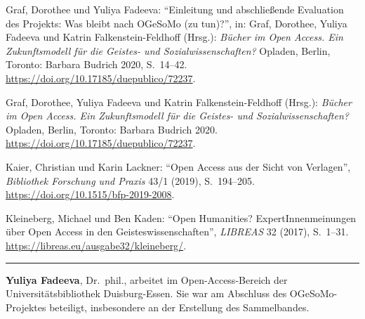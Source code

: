 \documentclass[a4paper,
fontsize=11pt,
oneside,
numbers=noperiodatend,
parskip=half-,
bibliography=totoc,
final
]{scrartcl}
\begin{document}
Graf, Dorothee und Yuliya Fadeeva: ``Einleitung und abschließende
Evaluation des Projekts: Was bleibt nach OGeSoMo (zu tun)?'', in: Graf,
Dorothee, Yuliya Fadeeva und Katrin Falkenstein-Feldhoff (Hrsg.):
\emph{Bücher im Open Access. Ein Zukunftsmodell für die Geistes- und
Sozialwissenschaften?} Opladen, Berlin, Toronto: Barbara Budrich 2020,
S.~14--42. \href{https://doi.org/10.17185/duepublico/72237}{https://doi.org/10.17185/due\-publico/72237}.

Graf, Dorothee, Yuliya Fadeeva und Katrin Falkenstein-Feldhoff (Hrsg.):
\emph{Bücher im Open Access. Ein Zukunftsmodell für die Geistes- und
Sozialwissenschaften?} Opladen, Berlin, Toronto: Barbara Budrich 2020.
\url{https://doi.org/10.17185/duepublico/72237}.

Kaier, Christian und Karin Lackner: ``Open Access aus der Sicht von
Verlagen'', \emph{Bibliothek Forschung und Praxis} 43/1 (2019),
S.~194--205. \url{https://doi.org/10.1515/bfp-2019-2008}.

Kleineberg, Michael und Ben Kaden: ``Open Humanities?
ExpertInnenmeinungen über Open Access in den Geisteswissenschaften'',
\emph{LIBREAS} 32 (2017), S.~1--31.
\url{https://libreas.eu/ausgabe32/kleineberg/}.

\begin{center}\rule{0.5\linewidth}{0.5pt}\end{center}

\textbf{Yuliya Fadeeva}, Dr.~phil., arbeitet im Open-Access-Bereich der
Universitätsbibliothek Duisburg-Essen. Sie war am Abschluss des
OGeSoMo-Projektes beteiligt, insbesondere an der Erstellung des
Sammelbandes.
\end{document}

